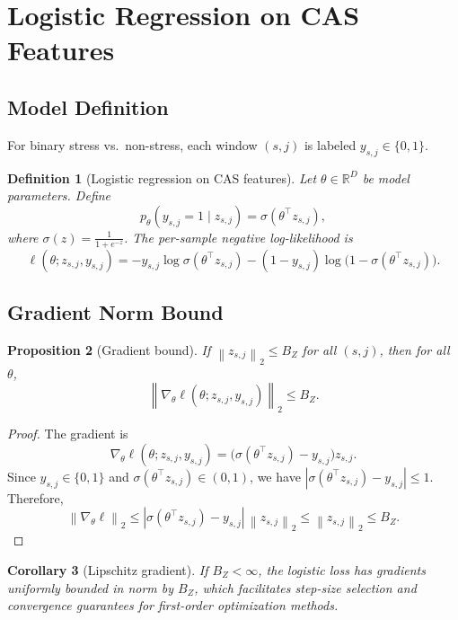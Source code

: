 \documentclass[11pt]{article}
\newtheorem{definition}{Definition}[section]
\newtheorem{proposition}[definition]{Proposition}
\newtheorem{corollary}[definition]{Corollary}
\newcommand{\R}{\mathbb{R}}
\newcommand{\norm}[1]{\left\lVert #1 \right\rVert}
\newcommand{\abs}[1]{\left\lvert #1 \right\rvert}
\begin{document}
\section{Logistic Regression on CAS Features}

\subsection{Model Definition}

For binary stress vs.\ non-stress, each window \((s,j)\) is labeled \(y_{s,j} \in \{0,1\}\).

\begin{definition}[Logistic regression on CAS features]
Let \(\theta \in \R^D\) be model parameters.
Define
\[
  p_\theta(y_{s,j}=1 \mid z_{s,j}) = \sigma(\theta^\top z_{s,j}),
\]
where \(\sigma(z) = \frac{1}{1+e^{-z}}\).
The per-sample negative log-likelihood is
\[
  \ell(\theta; z_{s,j}, y_{s,j})
  = -y_{s,j} \log \sigma(\theta^\top z_{s,j})
    - (1-y_{s,j}) \log \bigl(1-\sigma(\theta^\top z_{s,j})\bigr).
\]
\end{definition}

\subsection{Gradient Norm Bound}

\begin{proposition}[Gradient bound]
If \(\norm{z_{s,j}}_2 \le B_Z\) for all \((s,j)\), then for all \(\theta\),
\[
  \norm{\nabla_\theta \ell(\theta; z_{s,j}, y_{s,j})}_2 \le B_Z.
\]
\end{proposition}

\begin{proof}
The gradient is
\[
  \nabla_\theta \ell(\theta; z_{s,j}, y_{s,j})
  = \bigl(\sigma(\theta^\top z_{s,j}) - y_{s,j}\bigr) z_{s,j}.
\]
Since \(y_{s,j} \in \{0,1\}\) and \(\sigma(\theta^\top z_{s,j}) \in (0,1)\), we have
\(\abs{\sigma(\theta^\top z_{s,j}) - y_{s,j}} \le 1\).
Therefore,
\[
  \norm{\nabla_\theta \ell}_2
  \le \abs{\sigma(\theta^\top z_{s,j}) - y_{s,j}} \,\norm{z_{s,j}}_2
  \le \norm{z_{s,j}}_2 \le B_Z.
\]
\end{proof}

\begin{corollary}[Lipschitz gradient]
If \(B_Z < \infty\), the logistic loss has gradients uniformly bounded in norm by \(B_Z\), which facilitates step-size selection and convergence guarantees for first-order optimization methods.
\end{corollary}
\end{document}
